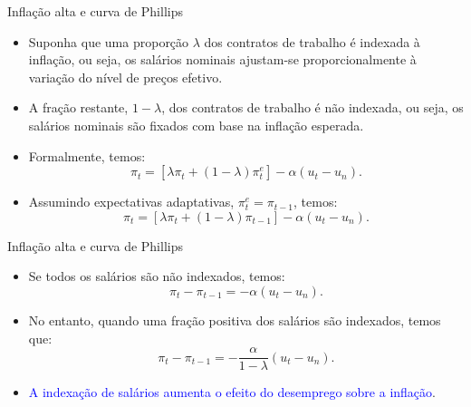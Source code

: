 \documentclass[10pt]{beamer}
\begin{document}
\begin{frame}{Inflação alta e curva de Phillips}
    \begin{itemize}
        \item Suponha que uma proporção $\lambda$ dos contratos de trabalho é indexada à inflação, ou seja, os salários nominais ajustam-se proporcionalmente à variação do nível de preços efetivo.
        \bigskip
        \item A fração restante, $1 - \lambda$, dos contratos de trabalho é não indexada, ou seja, os salários nominais são fixados com base na inflação esperada.
        \bigskip
        \item Formalmente, temos:
        \begin{equation}
            \pi_t = [\lambda\pi_t + (1-\lambda)\pi_t^e] - \alpha(u_t - u_n).
            \label{eq5}
        \end{equation}
        \bigskip
        \item Assumindo expectativas adaptativas, $\pi_t^e = \pi_{t-1}$, temos:
        \begin{equation}
            \pi_t = [\lambda\pi_t + (1-\lambda)\pi_{t-1}] - \alpha(u_t - u_n).
            \label{eq6}
        \end{equation}
    \end{itemize}
\end{frame}

\begin{frame}{Inflação alta e curva de Phillips}
    \begin{itemize}
        \item Se todos os salários são não indexados, temos:
        \[
        \pi_t - \pi_{t-1} = -\alpha (u_t - u_n).
        \]
        \bigskip
        \item No entanto, quando uma fração positiva dos salários são indexados, temos que:
        \[
        \pi_t - \pi_{t-1} = -\frac{\alpha}{1-\lambda}(u_t-u_n).
        \]
        \bigskip
        \item \textcolor{blue}{A indexação de salários aumenta o efeito do desemprego sobre a inflação}.
    \end{itemize}
\end{frame}
\end{document}
